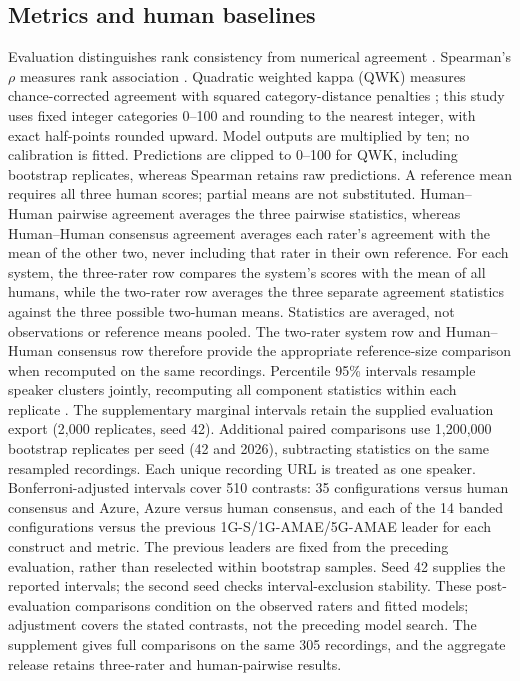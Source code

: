 \documentclass[10pt]{article}
\begin{document}
\subsection{Metrics and human baselines}
Evaluation distinguishes rank consistency from numerical agreement \cite{stemler,williamson}. Spearman's $\rho$ measures rank association \cite{spearman}. Quadratic weighted kappa (QWK) measures chance-corrected agreement with squared category-distance penalties \cite{cohen}; this study uses fixed integer categories 0--100 and rounding to the nearest integer, with exact half-points rounded upward. Model outputs are multiplied by ten; no calibration is fitted. Predictions are clipped to 0--100 for QWK, including bootstrap replicates, whereas Spearman retains raw predictions. A reference mean requires all three human scores; partial means are not substituted. Human--Human pairwise agreement averages the three pairwise statistics, whereas Human--Human consensus agreement averages each rater's agreement with the mean of the other two, never including that rater in their own reference. For each system, the three-rater row compares the system's scores with the mean of all humans, while the two-rater row averages the three separate agreement statistics against the three possible two-human means. Statistics are averaged, not observations or reference means pooled. The two-rater system row and Human--Human consensus row therefore provide the appropriate reference-size comparison when recomputed on the same recordings. Percentile 95\% intervals resample speaker clusters jointly, recomputing all component statistics within each replicate \cite{efron,field}. The supplementary marginal intervals retain the supplied evaluation export (2,000 replicates, seed 42). Additional paired comparisons use 1,200,000 bootstrap replicates per seed (42 and 2026), subtracting statistics on the same resampled recordings. Each unique recording URL is treated as one speaker. Bonferroni-adjusted intervals cover 510 contrasts: 35 configurations versus human consensus and Azure, Azure versus human consensus, and each of the 14 banded configurations versus the previous 1G-S/1G-AMAE/5G-AMAE leader for each construct and metric. The previous leaders are fixed from the preceding evaluation, rather than reselected within bootstrap samples. Seed 42 supplies the reported intervals; the second seed checks interval-exclusion stability. These post-evaluation comparisons condition on the observed raters and fitted models; adjustment covers the stated contrasts, not the preceding model search. The supplement gives full comparisons on the same 305 recordings, and the aggregate release retains three-rater and human-pairwise results.
\end{document}
